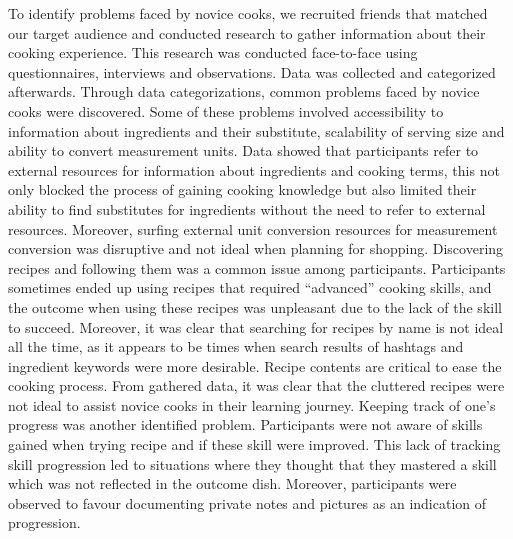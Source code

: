 \documentclass{sigchi}
\begin{document}
To identify problems faced by novice cooks, we recruited friends that matched our target audience and conducted research to gather information about their cooking experience. This research was conducted face-to-face using questionnaires, interviews and observations. Data was collected and categorized afterwards.\newline \newline
Through data categorizations, common problems faced by novice cooks were discovered. Some of these problems involved accessibility to information about ingredients and their substitute, scalability of serving size and ability to convert measurement units. Data showed that participants refer to external resources for information about ingredients and cooking terms, this not only blocked the process of gaining cooking knowledge but also limited their ability to find substitutes for ingredients without the need to refer to external resources. Moreover, surfing external unit conversion resources for measurement conversion was disruptive and not ideal when planning for shopping.
Discovering recipes and following them was a common issue among participants. Participants sometimes ended up using recipes that required “advanced” cooking skills, and the outcome when using these recipes was unpleasant due to the lack of the skill to succeed. Moreover, it was clear that searching for recipes by name is not ideal all the time, as it appears to be times when search results of hashtags and ingredient keywords were more desirable. Recipe contents are critical to ease the cooking process. From gathered data, it was clear that the cluttered recipes were not ideal to assist novice cooks in their learning journey.\newline \newline
Keeping track of one’s progress was another identified problem. Participants were not aware of skills gained when trying recipe and if these skill were improved. This lack of tracking skill progression led to situations where they thought that they mastered a skill which was not reflected in the outcome dish. Moreover, participants were observed to favour documenting private notes and pictures as an indication of progression.
\end{document}
